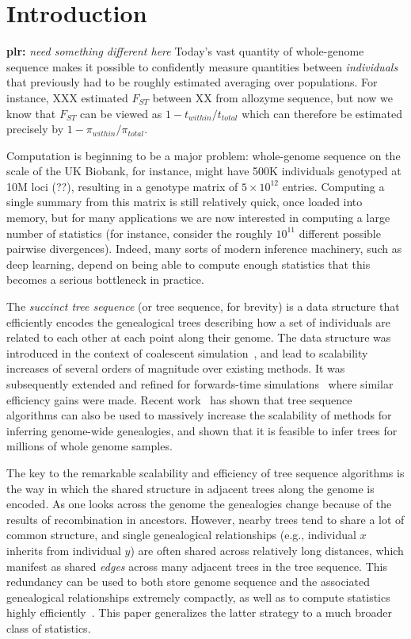 \documentclass{article}
\newcommand{\plr}[1]{{\color{blue}\textbf{plr:} \it #1}}
\begin{document}
\section*{Introduction}

\plr{need something different here}
Today's vast quantity of whole-genome sequence
makes it possible to confidently measure quantities
between \emph{individuals} that previously had to be roughly estimated
averaging over populations.
For instance, XXX estimated $F_{ST}$ between XX from allozyme sequence,
but now we know that $F_{ST}$ can be viewed as $1 - t_{within}/t_{total}$ \citep{slatkin_fst}
which can therefore be estimated precisely by $1 - \pi_{within}/\pi_{total}$.

Computation is beginning to be a major problem:
whole-genome sequence on the scale of the UK Biobank,
for instance, might have 500K individuals genotyped at 10M loci (??),
resulting in a genotype matrix of $5 \times 10^{12}$ entries.
Computing a single summary from this matrix is still relatively quick,
once loaded into memory,
but for many applications we are now interested in computing a large number of statistics
(for instance, consider the roughly $10^{11}$ different possible pairwise divergences).
Indeed, many sorts of modern inference machinery, such as deep learning,
depend on being able to compute enough statistics that this becomes a serious bottleneck in practice.

The \emph{succinct tree sequence} (or tree sequence, for brevity) is a data
structure that efficiently encodes the genealogical trees describing how a set of
individuals are related to each other at each point along their genome. The
data structure was introduced in the context of coalescent
simulation~\citep{kelleher2016efficient}, and lead to scalability increases of
several orders of magnitude over existing methods. It was subsequently extended
and refined for forwards-time simulations~\citep{kelleher2018efficient,haller2018tree}
where similar efficiency gains were made. Recent
work~\citep{kelleher2018inferring} has shown that tree sequence algorithms can
also be used to massively increase the scalability of methods for inferring
genome-wide genealogies, and shown that it is feasible to infer trees for
millions of whole genome samples.

The key to the remarkable scalability and efficiency of tree sequence
algorithms is the way in which the shared structure in adjacent trees along
the genome is encoded. As one looks across the genome the genealogies change
because of the results of recombination in ancestors.
However, nearby trees tend to share a lot of common structure,
and single genealogical relationships (e.g., individual $x$ inherits from individual $y$)
are often shared across relatively long distances,
which manifest as shared \emph{edges} across many adjacent trees in the tree sequence.
This redundancy can be used
to both store genome sequence and the associated genealogical relationships extremely compactly,
as well as to compute statistics highly efficiently~\citep{kelleher2016efficient}.
This paper generalizes the latter strategy to a much broader class of statistics.
\end{document}
